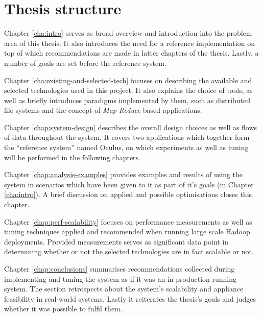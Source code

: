 \section{Thesis structure}
Chapter \ref{cha:intro} serves as broad overview and introduction into the problem area of this thesis. It also introduces the need for a reference implementation on top of which recommendations are made in latter chapters of the thesis. Lastly, a number of goals are set before the reference system.

Chapter \ref{cha:existing-and-selected-tech} focuses on describing the available and selected technologies used in this project. It also explains the choice of tools, as well as briefly introduces paradigms implemented by them, such as distributed file systems and the concept of \textit{Map Reduce} \cite{map-reduce} based applications.

Chapter \ref{chap:system-design} describes the overall design choices as well as flows of data throughout the system. It covers two applications which together form the ``reference system'' named Oculus, on which experiments as well as tuning will be performed in the following chapters.

Chapter \ref{chap:analysis-examples} provides examples and results of using the system in scenarios which have been given to it as part of it's goals (in Chapter \ref{cha:intro}). A brief discussion on applied and possible optimisations closes this chapter.

Chapter \ref{chap:perf-scalability} focuses on performance measurements as well as tuning techniques applied and recommended when running large scale Hadoop deployments. Provided measurements serves as significant data point in determining whether or not the selected technologies are in fact scalable or not.

Chapter \ref{chap:conclusions} summarises recommendations collected during implementing and tuning the system as if it was an in-production running system. The section retrospects about the system's scalability and appliance feasibility in real-world systems. Lastly it reiterates the thesis's goals and judges whether it was possible to fulfil them.






